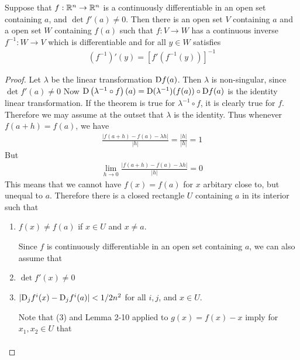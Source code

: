 \begin{theorem}\label{theorem:2-11}
    Suppose that $f:\mathbb{R}^n\to \mathbb{R}^n$ is a continuously differentiable in an open set 
    containing $a$, and $\det f'(a)\neq 0$. Then there is an open set $V$ containing $a$ and 
    a open set $W$ containing $f(a)$ such that $f:V\to W$ has a continuous inverse $f^{-1}:W\to V$ which 
    is differentiable and for all $y\in W$ satisfies 
    \begin{align*}
        (f^{-1})'(y) = \left[f'\left(f^{-1}(y)\right)\right]^{-1}
    \end{align*}
\end{theorem}

\begin{proof}
    Let $\lambda$ be the linear transformation $\mathrm{D}f(a)$. Then $\lambda$ is non-singular,
    since $\det f'(a)\neq 0$ Now $\mathrm{D}\left(\lambda^{-1}\circ f\right)(a) = \mathrm{D}(\lambda^{-1})(f(a))\circ \mathrm{D}f(a)$
    is the identity linear transformation. If the theorem is true for $\lambda^{-1}\circ f$, it is 
    clearly true for $f$. Therefore we may assume at the outset that $\lambda$ is the identity. 
    Thus whenever $f(a+h) = f(a)$, we have 
    \begin{align*}
        \frac{\left|f(a+h) - f(a) - \lambda h\right|}{|h|}
        = \frac{|h|}{|h|}
        = 1
    \end{align*}
    But 
    \begin{align*}
        \lim_{h\to 0}{\frac{\left|f(a+h) - f(a) - \lambda h\right|}{|h|}}
        = 0
    \end{align*}
    This means that we cannot have $f(x)=f(a)$ for $x$ arbitary close to, but unequal to $a$.
    Therefore there is a closed rectangle $U$ containing $a$ in its interior such that 
    \begin{enumerate}[label={\upshape(\arabic*)}]
        \item $f(x)\neq f(a)$ if $x\in U$ and $x\neq a$.\par 
            Since $f$ is continuously differentiable in 
            an open set containing $a$, we can also assume that
        \item $\det f'(x)\neq 0$ 
        \item $|\mathrm{D}_jf^i(x) - \mathrm{D}_jf^i(a)| < 1/2n^2$ for all $i, j$, and $x\in U$.\par 
            Note that (3) and Lemma 2-10 applied to $g(x)=f(x) - x$ imply for $x_1, x_2\in U$ that 
            \begin{align*}

\end{align*}
\end{enumerate}
\end{proof}
